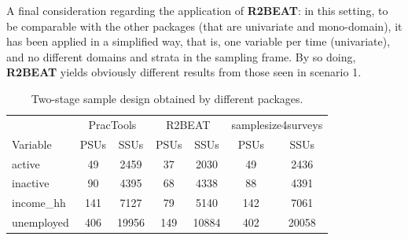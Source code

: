 A final consideration regarding the application of \textbf{R2BEAT}: in this setting, to be comparable with the other packages (that are univariate and mono-domain), it has been applied in a simplified way, that is, one variable per time (univariate), and no different domains and strata in the sampling frame. By so doing, \textbf{R2BEAT} yields obviously different results from those seen in scenario 1.
\begin{table}[h!]
	\caption{Two-stage sample design obtained by different packages.}
	\centering
	\begin{tabular}{|l||c|c|c|c|c|c| }
		\hline
		& \multicolumn{2}{c|}{PracTools} & \multicolumn{2}{c|}{R2BEAT} & \multicolumn{2}{c|}{samplesize4surveys} \\
		Variable   & PSUs &          SSUs           & PSUs &               SSUs               & PSUs &         SSUs         \\ \hline
		active     &  49  &          2459           &  37  &               2030               &  49  &         2436         \\
		inactive   &  90  &          4395           &  68  &               4338               &  88  &         4391         \\
		income\_hh & 141  &          7127           &  79  &               5140               & 142  &         7061         \\
		unemployed & 406  &         19956           & 149  &              10884               & 402  &        20058         \\ \hline
	\end{tabular}
	\label{results}
\end{table}	

